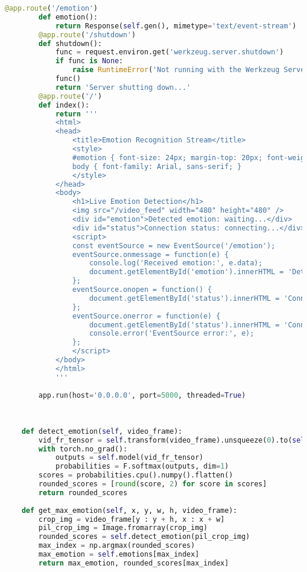 \begin{lstlisting}[language=Python, caption={Python skript pre rozpoznávanie emócií}, label={lst:emotion-recognition}]
        @app.route('/emotion')
        def emotion():
            return Response(self.gen(), mimetype='text/event-stream')
        @app.route('/shutdown')
        def shutdown():
            func = request.environ.get('werkzeug.server.shutdown')
            if func is None:
                raise RuntimeError('Not running with the Werkzeug Server')
            func()
            return 'Server shutting down...'
        @app.route('/')
        def index():
            return '''
            <html>
            <head>
                <title>Emotion Recognition Stream</title>
                <style>
                #emotion { font-size: 24px; margin-top: 20px; font-weight: bold; }
                body { font-family: Arial, sans-serif; }
                </style>
            </head>
            <body>
                <h1>Live Emotion Detection</h1>
                <img src="/video_feed" width="480" height="480" />
                <div id="emotion">Detected emotion: waiting...</div>
                <div id="status">Connection status: connecting...</div>
                <script>
                const eventSource = new EventSource('/emotion');
                eventSource.onmessage = function(e) {
                    console.log('Received emotion:', e.data);
                    document.getElementById('emotion').innerHTML = 'Detected emotion: ' + e.data;
                };
                eventSource.onopen = function() {
                    document.getElementById('status').innerHTML = 'Connection status: connected';
                };
                eventSource.onerror = function(e) {
                    document.getElementById('status').innerHTML = 'Connection status: error/reconnecting';
                    console.error('EventSource error:', e);
                };
                </script>
            </body>
            </html>
            '''
        
        app.run(host='0.0.0.0', port=5000, threaded=True)

        
    
    def detect_emotion(self, video_frame):
        vid_fr_tensor = self.transform(video_frame).unsqueeze(0).to(self.device)
        with torch.no_grad():
            outputs = self.model(vid_fr_tensor)
            probabilities = F.softmax(outputs, dim=1)
        scores = probabilities.cpu().numpy().flatten()
        rounded_scores = [round(score, 2) for score in scores]
        return rounded_scores
    
    def get_max_emotion(self, x, y, w, h, video_frame):
        crop_img = video_frame[y : y + h, x : x + w]
        pil_crop_img = Image.fromarray(crop_img)
        rounded_scores = self.detect_emotion(pil_crop_img)    
        max_index = np.argmax(rounded_scores)
        max_emotion = self.emotions[max_index]
        return max_emotion, rounded_scores[max_index]
    

\end{lstlisting}
